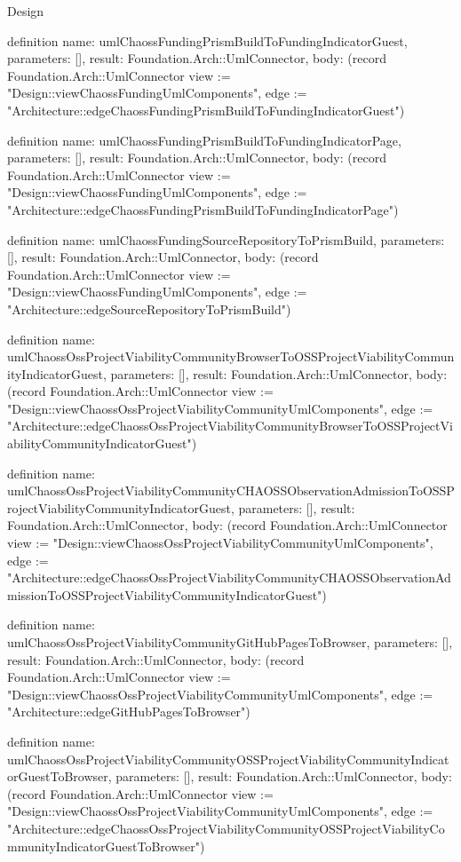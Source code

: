 \begin{lexlean}{Design}
\begin{semanticmodule}
definition{
  name: umlChaossFundingPrismBuildToFundingIndicatorGuest,
  parameters: [],
  result: Foundation.Arch::UmlConnector,
  body: (record Foundation.Arch::UmlConnector {view := "Design::viewChaossFundingUmlComponents", edge := "Architecture::edgeChaossFundingPrismBuildToFundingIndicatorGuest"})
}

definition{
  name: umlChaossFundingPrismBuildToFundingIndicatorPage,
  parameters: [],
  result: Foundation.Arch::UmlConnector,
  body: (record Foundation.Arch::UmlConnector {view := "Design::viewChaossFundingUmlComponents", edge := "Architecture::edgeChaossFundingPrismBuildToFundingIndicatorPage"})
}

definition{
  name: umlChaossFundingSourceRepositoryToPrismBuild,
  parameters: [],
  result: Foundation.Arch::UmlConnector,
  body: (record Foundation.Arch::UmlConnector {view := "Design::viewChaossFundingUmlComponents", edge := "Architecture::edgeSourceRepositoryToPrismBuild"})
}

definition{
  name: umlChaossOssProjectViabilityCommunityBrowserToOSSProjectViabilityCommunityIndicatorGuest,
  parameters: [],
  result: Foundation.Arch::UmlConnector,
  body: (record Foundation.Arch::UmlConnector {view := "Design::viewChaossOssProjectViabilityCommunityUmlComponents", edge := "Architecture::edgeChaossOssProjectViabilityCommunityBrowserToOSSProjectViabilityCommunityIndicatorGuest"})
}

definition{
  name: umlChaossOssProjectViabilityCommunityCHAOSSObservationAdmissionToOSSProjectViabilityCommunityIndicatorGuest,
  parameters: [],
  result: Foundation.Arch::UmlConnector,
  body: (record Foundation.Arch::UmlConnector {view := "Design::viewChaossOssProjectViabilityCommunityUmlComponents", edge := "Architecture::edgeChaossOssProjectViabilityCommunityCHAOSSObservationAdmissionToOSSProjectViabilityCommunityIndicatorGuest"})
}

definition{
  name: umlChaossOssProjectViabilityCommunityGitHubPagesToBrowser,
  parameters: [],
  result: Foundation.Arch::UmlConnector,
  body: (record Foundation.Arch::UmlConnector {view := "Design::viewChaossOssProjectViabilityCommunityUmlComponents", edge := "Architecture::edgeGitHubPagesToBrowser"})
}

definition{
  name: umlChaossOssProjectViabilityCommunityOSSProjectViabilityCommunityIndicatorGuestToBrowser,
  parameters: [],
  result: Foundation.Arch::UmlConnector,
  body: (record Foundation.Arch::UmlConnector {view := "Design::viewChaossOssProjectViabilityCommunityUmlComponents", edge := "Architecture::edgeChaossOssProjectViabilityCommunityOSSProjectViabilityCommunityIndicatorGuestToBrowser"})
}


\end{semanticmodule}
\end{lexlean}
